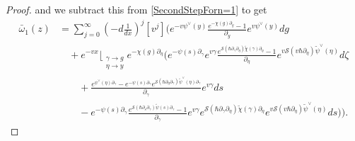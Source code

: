 \documentclass[10pt,a4paper,oneside,no-math,reqno]{amsart}%
\theoremstyle{plain}
\theoremstyle{definition}
\theoremstyle{remark}
\numberwithin{equation}{section}
\newcommand{\mc}[1]{\mathcal{#1}}
\newcommand{\1}{\mathds{1}}
\newcommand{\<}{\langle}
\renewcommand{\>}{\rangle}
\newcommand{\del}{\partial}
\begin{document}
\begin{proof}
	and we subtract this from \cref{SecondStepForn=1} to get
	\begin{equation}
		\begin{split}
			\bar{\omega}_1 (z)
            &=
            \sum_{j=0}^\infty (-d \frac{1}{dx})^j [v^j ]
			\Bigg(
            e^{-v \psi^\vee (y)} \frac{ e^{- \chi (g) \del_y} -1 }{\del_y} e^{v \psi^\vee(y) } dg
			\\
			&\quad
			+
    	    e^{-vx} \Big\lfloor_{\substack{\gamma \to g \\ \eta \to y}} e^{- \chi (g) \del_\eta}
			\bigg( 
    	    e^{-\psi (s) \del_\gamma}e^{v\gamma} \frac{e^{ \mc{S}( \hbar \del_\gamma \del_\eta) \tilde{\chi} (\gamma) \del_\eta} - 1}{\del_\eta} e^{v \mc{S}(v\hbar \del_{\eta}) \tilde{\psi}^\vee(\eta) } d\zeta
    	    \\
    	    &\qquad
    	    +
            \frac{ e^{\psi^\vee (\eta) \del_\gamma} -e^{-\psi (s) \del_\gamma} e^{ \mc{S}(\hbar \del_{\eta} \del_\gamma) \tilde{\psi}^\vee(\eta) \del_\gamma} }{\del_\gamma} e^{v \gamma} ds
            \\
            &\qquad
            - 
    	    e^{-\psi (s) \del_\gamma} \frac{e^{ \mc{S}(\hbar \del_s \del_\gamma) \tilde{\psi}(s) \del_\gamma} - 1}{\del_\gamma} e^{v\gamma} e^{ \mc{S}(\hbar \del_\gamma \del_\eta) \tilde{\chi}(\gamma) \del_\eta }
            e^{v \mc{S}(v\hbar \del_{\eta}) \tilde{\psi}^\vee(\eta) }
			ds \bigg)
            \Bigg) .
		\end{split}
	\end{equation}


\end{proof}
\end{document}
